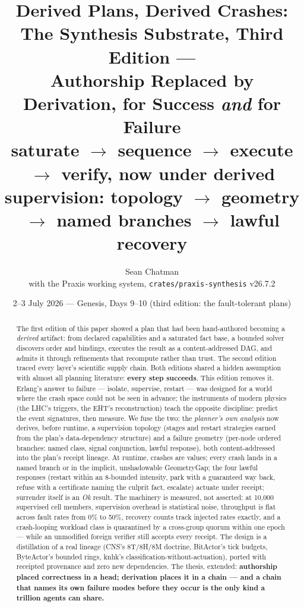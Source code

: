 \documentclass[11pt,a4paper]{article}
\title{\textbf{Derived Plans, Derived Crashes:}\\
\large The Synthesis Substrate, Third Edition ---\\
Authorship Replaced by Derivation, for Success \emph{and} for Failure\\
\normalsize saturate $\to$ sequence $\to$ execute $\to$ verify, now under
derived supervision: topology $\to$ geometry $\to$ named branches $\to$ lawful recovery}
\author{Sean Chatman \\ \small with the Praxis working system, \texttt{crates/praxis-synthesis} v26.7.2}
\date{2--3 July 2026 --- Genesis, Days 9--10 (third edition: the fault-tolerant plans)}
\theoremstyle{definition}
\theoremstyle{remark}
\begin{document}
\maketitle

\begin{abstract}
\noindent
The first edition of this paper showed a plan that had been hand-authored
becoming a \emph{derived} artifact: from declared capabilities and a
saturated fact base, a bounded solver discovers order and bindings, executes
the result as a content-addressed DAG, and admits it through refinements
that recompute rather than trust. The second edition traced every layer's
scientific supply chain. Both editions shared a hidden assumption with
almost all planning literature: \textbf{every step succeeds}. This edition
removes it. Erlang's answer to failure --- isolate, supervise, restart ---
was designed for a world where the crash space could not be seen in
advance; the instruments of modern physics (the LHC's triggers, the EHT's
reconstruction) teach the opposite discipline: predict the event
signatures, then measure. We fuse the two: the \emph{planner's own
analysis} now derives, before runtime, a supervision topology (stages and
restart strategies earned from the plan's data-dependency structure) and a
failure geometry (per-node ordered branches: named class, signal
conjunction, lawful response), both content-addressed into the plan's
receipt lineage. At runtime, crashes are values; every crash lands in a
named branch or in the implicit, unshadowable \textsf{GeometryGap}; the
four lawful responses (restart within an 8-bounded intensity, park with a
guaranteed way back, refuse with a certificate naming the culprit fact,
escalate) actuate under receipt; surrender itself is an \emph{Ok} result.
The machinery is measured, not asserted: at 10{,}000 supervised cell
members, supervision overhead is statistical noise, throughput is flat
across fault rates from 0\% to 50\%, recovery counts track injected rates
exactly, and a crash-looping workload class is quarantined by a
cross-group quorum within one epoch --- while an unmodified foreign
verifier still accepts every receipt. The design is a distillation of a
real lineage (CNS's 8T/8H/8M doctrine, BitActor's tick budgets, ByteActor's
bounded rings, knhk's classification-without-actuation), ported with
receipted provenance and zero new dependencies. The thesis, extended:
\textbf{authorship placed correctness in a head; derivation places it in a
chain --- and a chain that names its own failure modes before they occur
is the only kind a trillion agents can share.}
\end{abstract}
\end{document}
